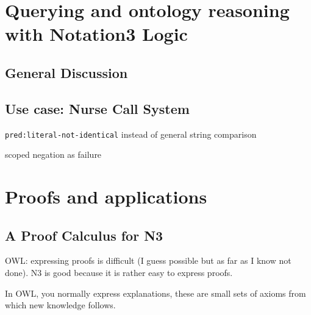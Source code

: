 \documentclass[11pt,a4paper,twoside]{book}
\begin{document}





\chapter{Querying and ontology reasoning with Notation3 Logic}\label{others}
\section{General Discussion}\label{gen}
\section{Use case: Nurse Call System}\label{orca}
%

\label{validation}

\texttt{pred:literal-not-identical} instead of general string comparison



scoped negation as failure
\chapter{Proofs and applications}\label{proof}

\section{A Proof Calculus for N3}\label{cal}
OWL: expressing proofs is difficult (I guess possible but as far as I know not done). N3 is good because it is rather  easy to express proofs.

In OWL, you normally express explanations, these are small sets of axioms from which new knowledge follows.
%
%
\end{document}
